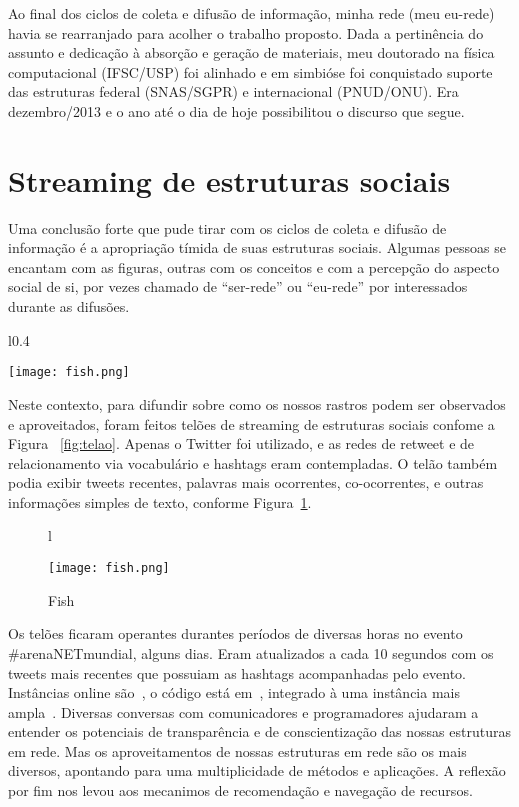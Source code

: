 \documentclass[a4paper, 11pt]{article} %
\begin{document}
Ao final dos ciclos de coleta e difusão de informação, minha rede (meu eu-rede) havia se rearranjado para acolher o trabalho proposto. Dada a pertinência do assunto e dedicação à absorção e geração de materiais, meu doutorado na física computacional (IFSC/USP) foi alinhado e em simbióse foi conquistado suporte das estruturas federal (SNAS/SGPR) e internacional (PNUD/ONU). Era dezembro/2013 e o ano até o dia de hoje possibilitou o discurso que segue.



\section*{Streaming de estruturas sociais}

Uma conclusão forte que pude tirar com os ciclos de coleta e difusão de informação é a apropriação tímida de suas estruturas sociais. Algumas pessoas se encantam com as figuras, outras com os conceitos e com a percepção do aspecto social de si, por vezes chamado de ``ser-rede'' ou ``eu-rede'' por interessados durante as difusões.

\begin{wrapfigure}{l}{0.4\textwidth} %
\begin{center}
\texttt{[image: fish.png]}
\end{center}
\caption{Fish}\label{fig:telao}
\end{wrapfigure}

Neste contexto, para difundir sobre como os nossos rastros podem ser observados e aproveitados, foram feitos telões de streaming de estruturas sociais confome a Figura ~\ref{fig:telao}. Apenas o Twitter foi utilizado, e as redes de retweet e de relacionamento via vocabulário e hashtags eram contempladas. O telão também podia exibir tweets recentes, palavras mais ocorrentes, co-ocorrentes, e outras informações simples de texto, conforme Figura~\ref{fig:telao2}.

\begin{figure}{l}
\begin{center}
\texttt{[image: fish.png]}
\end{center}
\caption{Fish}\label{fig:telao2}
\end{figure}

Os telões ficaram operantes durantes períodos de diversas horas no evento \#arenaNETmundial, alguns dias. Eram atualizados a cada 10 segundos com os tweets mais recentes que possuiam as hashtags acompanhadas pelo evento. Instâncias online são~\cite{ocupagov,outrotelao}, o código está em~\cite{codTelao}, integrado à uma instância mais ampla~\cite{MMISSA}. Diversas conversas com comunicadores e programadores ajudaram a entender os potenciais de transparência e de conscientização das nossas estruturas em rede.
Mas os aproveitamentos de nossas estruturas em rede são os mais diversos, apontando para uma multiplicidade de métodos e aplicações. A reflexão por fim nos levou aos mecanimos de recomendação e navegação de recursos.
\end{document}
